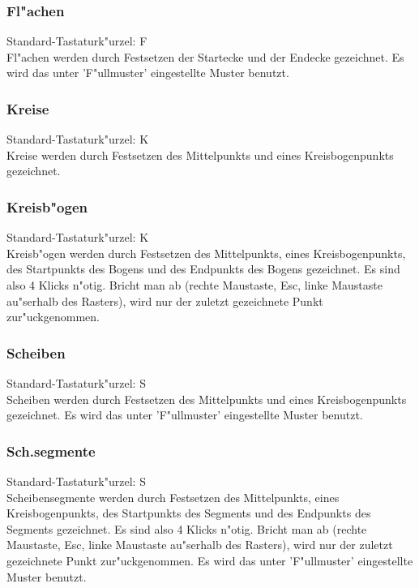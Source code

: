 \subsubsection{Fl"achen}
Standard-Tastaturk"urzel: F \\ 
Fl"achen werden durch Festsetzen der Startecke und der
Endecke gezeichnet. Es wird das unter 'F"ullmuster' 
eingestellte Muster benutzt.

\subsubsection{Kreise}
Standard-Tastaturk"urzel: K \\ 
Kreise werden durch Festsetzen des Mittelpunkts und eines
Kreisbogenpunkts gezeichnet.

\subsubsection{Kreisb"ogen}
Standard-Tastaturk"urzel: {\alternate}K \\ 
Kreisb"ogen werden durch Festsetzen des Mittelpunkts, eines
Kreisbogenpunkts, des Startpunkts des Bogens und des Endpunkts
des Bogens gezeichnet. Es sind also 4 Klicks n"otig. Bricht
man ab (rechte Maustaste, Esc, linke Maustaste au"serhalb des
Rasters), wird nur der zuletzt gezeichnete Punkt zur"uckgenommen.

\subsubsection{Scheiben}
Standard-Tastaturk"urzel: S \\ 
Scheiben werden durch Festsetzen des Mittelpunkts und eines
Kreisbogenpunkts gezeichnet. Es wird das unter 'F"ullmuster' 
eingestellte Muster benutzt.

\subsubsection{Sch.segmente}
Standard-Tastaturk"urzel: {\alternate}S \\ 
Scheibensegmente werden durch Festsetzen des Mittelpunkts, eines
Kreisbogenpunkts, des Startpunkts des Segments und des Endpunkts
des Segments gezeichnet. Es sind also 4 Klicks n"otig. Bricht
man ab (rechte Maustaste, Esc, linke Maustaste au"serhalb des
Rasters), wird nur der zuletzt gezeichnete Punkt zur"uckgenommen.
Es wird das unter 'F"ullmuster' eingestellte Muster benutzt.

